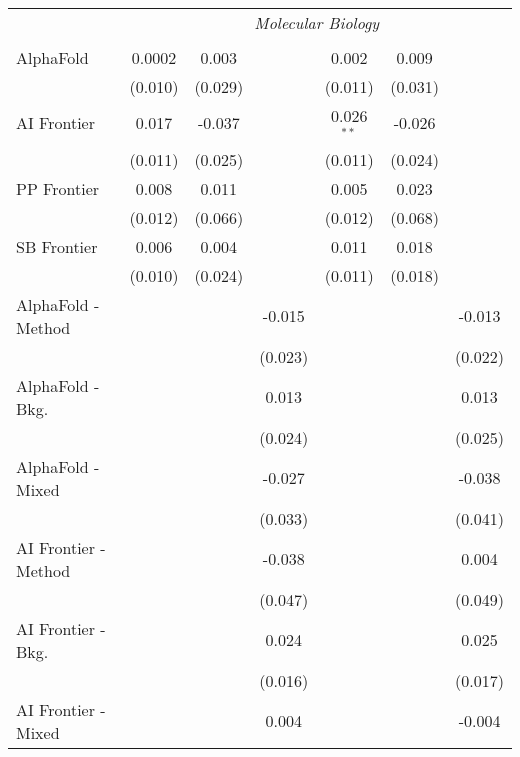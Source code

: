 \begin{tabular}{lcccccc}
 & \multicolumn{6}{c}{\textit{Molecular Biology}} \\ \\
   AlphaFold            & 0.0002  & 0.003   &              & 0.002        & 0.009   &   \\   
                        & (0.010) & (0.029) &              & (0.011)      & (0.031) &   \\   
   AI Frontier          & 0.017   & -0.037  &              & 0.026$^{**}$ & -0.026  &   \\   
                        & (0.011) & (0.025) &              & (0.011)      & (0.024) &   \\   
   PP Frontier          & 0.008   & 0.011   &              & 0.005        & 0.023   &   \\   
                        & (0.012) & (0.066) &              & (0.012)      & (0.068) &   \\   
   SB Frontier          & 0.006   & 0.004   &              & 0.011        & 0.018   &   \\   
                        & (0.010) & (0.024) &              & (0.011)      & (0.018) &   \\   
   AlphaFold - Method   &         &         & -0.015       &              &         & -0.013\\   
                        &         &         & (0.023)      &              &         & (0.022)\\   
   AlphaFold - Bkg.     &         &         & 0.013        &              &         & 0.013\\   
                        &         &         & (0.024)      &              &         & (0.025)\\   
   AlphaFold - Mixed    &         &         & -0.027       &              &         & -0.038\\   
                        &         &         & (0.033)      &              &         & (0.041)\\   
   AI Frontier - Method &         &         & -0.038       &              &         & 0.004\\   
                        &         &         & (0.047)      &              &         & (0.049)\\   
   AI Frontier - Bkg.   &         &         & 0.024        &              &         & 0.025\\   
                        &         &         & (0.016)      &              &         & (0.017)\\   
   AI Frontier - Mixed  &         &         & 0.004        &              &         & -0.004\\   

\end{tabular}
